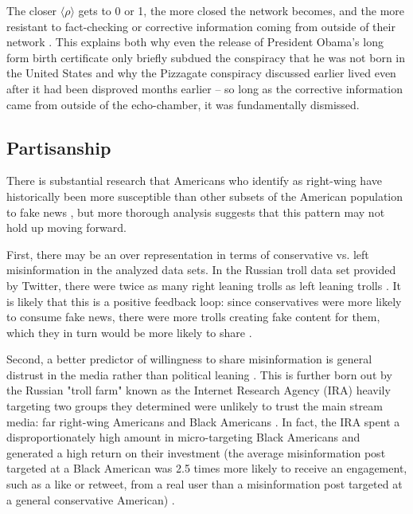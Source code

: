 \documentclass[NETN,manuscript]{stjour-new}
\begin{document}
The closer $\langle \rho \rangle$ gets to 0 or 1, the more closed the network becomes, and the more resistant to fact-checking or corrective information coming from outside of their network \citep{garrett2013undermining,lord1979biased,edwards1996disconfirmation,redlawsk2002hot, taber2006motivated}. This explains both why even the release of President Obama's long form birth certificate only briefly subdued the conspiracy that he was not born in the United States \citep{nyhan2012new} and why the Pizzagate conspiracy discussed earlier lived even after it had been disproved months earlier -- so long as the corrective information came from outside of the echo-chamber, it was fundamentally dismissed.


\subsection{Partisanship} 
There is substantial research that Americans who identify as right-wing have historically been more susceptible than other subsets of the American population to fake news \citep{guess2019less,benkler2018network,grinberg2019fake,allcott2017social,badawy2018analyzing}, but more thorough analysis suggests that this pattern may not hold up moving forward.

First, there may be an over representation in terms of conservative vs. left misinformation in the analyzed data sets. In the Russian troll data set provided by Twitter, there were twice as many right leaning trolls as left leaning trolls \citep{freelon2020black,badawy2018analyzing,benkler2018network}. It is likely that this is a positive feedback loop: since conservatives were more likely to consume fake news, there were more trolls creating fake content for them, which they in turn would be more likely to share \citep{bakir2018fake,bodo2019interested,silverman2016analysis,pariser2011filter}. 


Second, a better predictor of willingness to share misinformation is general distrust in the media rather than political leaning \citep{hopp2020people,shin2017partisan,kahan2012ideology,lewandowsky2016motivated,swire2017processing,mourao2019fake}. This is further born out by the Russian "troll farm" known as the Internet Research Agency (IRA) heavily targeting two groups they determined were unlikely to trust the main stream media: far right-wing Americans and Black Americans \citep{diresta2019tactics,howard2019ira,boatwright2018troll,jamieson2020cyberwar,mueller2019mueller,freelon2020black}. In fact, the IRA spent a disproportionately high amount in micro-targeting Black Americans and generated a high return on their investment (the average misinformation post targeted at a Black American was 2.5 times more likely to receive an engagement, such as a like or retweet, from a real user than a misinformation post targeted at a general conservative American) \citep{howard2019ira,freelon2020black}.
\end{document}
